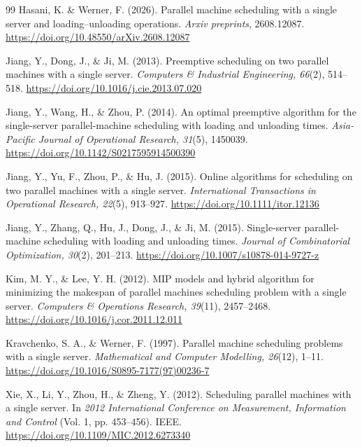 \documentclass[11pt]{article}
\begin{document}
\begin{thebibliography}{99}
Hasani, K. \& Werner, F. (2026).
Parallel machine scheduling with a single server and
loading–unloading operations.
\emph{Arxiv preprints}, 2608.12087.
\url{https://doi.org/10.48550/arXiv.2608.12087}


Jiang, Y., Dong, J., \& Ji, M. (2013).
Preemptive scheduling on two parallel machines with a single server.
\emph{Computers \& Industrial Engineering, 66}(2), 514--518.
\url{https://doi.org/10.1016/j.cie.2013.07.020}

Jiang, Y., Wang, H., \& Zhou, P. (2014).
An optimal preemptive algorithm for the single-server parallel-machine scheduling with loading and unloading times.
\emph{Asia-Pacific Journal of Operational Research, 31}(5), 1450039.
\url{https://doi.org/10.1142/S0217595914500390}

Jiang, Y., Yu, F., Zhou, P., \& Hu, J. (2015).
Online algorithms for scheduling on two parallel machines with a single server.
\emph{International Transactions in Operational Research, 22}(5), 913--927.
\url{https://doi.org/10.1111/itor.12136}

Jiang, Y., Zhang, Q., Hu, J., Dong, J., \& Ji, M. (2015).
Single-server parallel-machine scheduling with loading and unloading times.
\emph{Journal of Combinatorial Optimization, 30}(2), 201--213.
\url{https://doi.org/10.1007/s10878-014-9727-z}

Kim, M. Y., \& Lee, Y. H. (2012).
MIP models and hybrid algorithm for minimizing the makespan of parallel machines scheduling problem with a single server.
\emph{Computers \& Operations Research, 39}(11), 2457--2468.
\url{https://doi.org/10.1016/j.cor.2011.12.011}

Kravchenko, S. A., \& Werner, F. (1997).
Parallel machine scheduling problems with a single server.
\emph{Mathematical and Computer Modelling, 26}(12), 1--11.
\url{https://doi.org/10.1016/S0895-7177(97)00236-7}

Xie, X., Li, Y., Zhou, H., \& Zheng, Y. (2012).
Scheduling parallel machines with a single server.
In \emph{2012 International Conference on Measurement, Information and Control} (Vol. 1, pp. 453--456). IEEE.
\url{https://doi.org/10.1109/MIC.2012.6273340}

\end{thebibliography}
\end{document}
